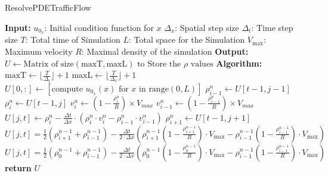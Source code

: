 \documentclass{article}
\begin{document}
		\begin{algorithm}[H]
			\caption{ResolvePDETrafficFlow}\label{alg:euler_traffic_flow}
			\begin{algorithmic}
				\State \textbf{Input:}
				\State $u_{0_x}$: Initial condition function for $x$
				\State $\Delta_x$: Spatial step size
				\State $\Delta_t$: Time step size
				\State $T$: Total time of Simulation
				\State $L$: Total space for the Simulation
				\State $V_{\text{max}}$: Maximum velocity
				\State $R$: Maximal density of the simulation
				\State \textbf{Output:}
				\State $U \gets \text{Matrix of size}(\text{maxT}, \text{maxL}) \text{ to Store the $\rho$ values}$
				\State \textbf{Algorithm:}
				\State $\text{maxT} \gets \lfloor  \frac{T}{\Delta_t} \rfloor  + 1$ \newline
				\State $\text{maxL} \gets \lfloor  \frac{T}{\Delta_x} \rfloor  + 1$ \newline
				\State $U[0, :] \gets \left[ \text{compute } u_{0_x}(x) \text{ for } x \text{ in } \text{range}(0, L) \right]$
				\State $\rho_{i-1}^n \gets U[t-1, j-1]$
				\State $\rho_i^n \gets U[t-1, j]$
				\State $v_i^n \gets \left( 1 - \frac{\rho_i^n}{R}\right)  \times V_{max}$ \newline
				\State $v_{i-1}^n \gets \left( 1 - \frac{\rho_{i-1}^n}{R}\right)  \times V_{max}$
				\State $U[j,t] \gets \rho_i^n - \frac{\Delta t}{\Delta x} \cdot \left(\rho_i^n \cdot v_i^n - \rho_{i-1}^n \cdot v_{i-1}^n\right)$
				\State $\rho_{i+1}^n \gets U[t-1, j+1]$
				\State $\boxed{U[j,t] = \frac{1}{2} \left(\rho_{i+1}^{n-1} + \rho_{i-1}^{n-1}\right) - \frac{\Delta t}{2 \cdot \Delta x} \left( \rho_{i+1}^{n-1} \left(1 - \frac{\rho_{i+1}^{n-1}}{R}\right) \cdot V_{\text{max}} - \rho_{i-1}^{n-1} \left(1 - \frac{\rho_{i-1}^{n-1}}{R}\right) \cdot V_{\text{max}} \right)}$
				\Else
				\State $\boxed{U[j,t] = \frac{1}{2} \left(\rho_{0}^{n-1} + \rho_{i-1}^{n-1}\right) - \frac{\Delta t}{2 \cdot \Delta x} \left( \rho_{0}^{n-1} \left(1 - \frac{\rho_{0}^{n-1}}{R}\right) \cdot V_{\text{max}} - \rho_{i-1}^{n-1} \left(1 - \frac{\rho_{i-1}^{n-1}}{R}\right) \cdot V_{\text{max}} \right)}$
				\EndIf
				\EndIf
				\EndFor
				\EndFor
				\State \textbf{return} $U$
			\end{algorithmic}
		\end{algorithm}
\end{document}
